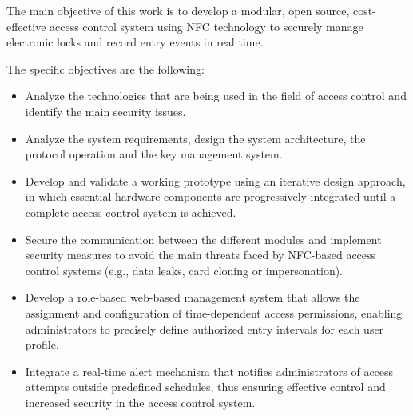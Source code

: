 The main objective of this work is to develop a modular, open source, cost-effective access control system using NFC technology to securely manage electronic locks and record entry events in real time.

The specific objectives are the following:
\begin{itemize}
	\item Analyze the technologies that are being used in the field of access control and identify the main security issues.
	\item Analyze the system requirements, design the system architecture, the protocol operation and the key management system.
	\item Develop and validate a working prototype using an iterative design approach, in which essential hardware components are progressively integrated until a complete access control system is achieved.
	\item Secure the communication between the different modules and implement security measures to avoid the main threats faced by NFC-based access control systems (e.g., data leaks, card cloning or impersonation).
	\item Develop a role-based web-based management system that allows the assignment and configuration of time-dependent access permissions, enabling administrators to precisely define authorized entry intervals for each user profile.
	\item Integrate a real-time alert mechanism that notifies administrators of access attempts outside predefined schedules, thus ensuring effective control and increased security in the access control system.
\end{itemize}

